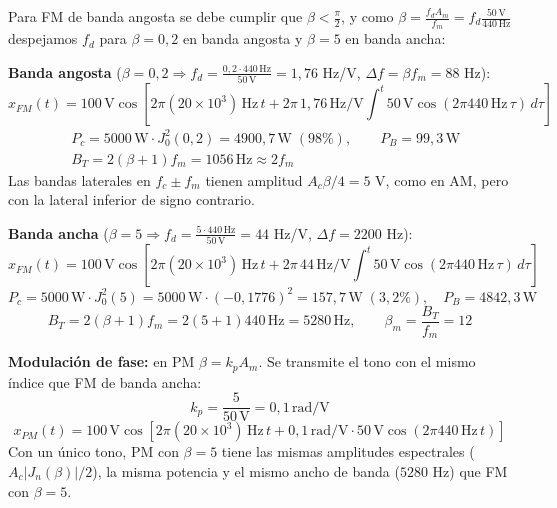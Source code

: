 \documentclass[11pt,a4paper]{article}
\numberwithin{equation}{section}
\begin{document}
Para FM de banda angosta se debe cumplir que $\beta < \frac{\pi}{2}$, y como $\beta =\frac{f_dA_m}{f_m}=f_d\frac{50\,\mathrm{V}}{440\,\mathrm{Hz}}$ despejamos $f_d$ para $\beta = 0,2$ en banda angosta y $\beta = 5$ en banda ancha:

\textbf{Banda angosta} ($\beta=0,2 \Rightarrow f_d=\frac{0,2\cdot 440\,\mathrm{Hz}}{50\,\mathrm{V}}=1,76$ Hz/V, $\Delta f=\beta f_m=88$ Hz):
\begin{equation}
  x_{FM}(t)=100\,\mathrm{V}\cos\left[ 2\pi (20\times 10^3)\,\mathrm{Hz}\,t + 2\pi\, 1,76\,\mathrm{Hz/V}\int_{}^{t} 50\,\mathrm{V}\cos(2\pi 440\,\mathrm{Hz}\,\tau)\, d\tau \right]
\end{equation}
\begin{equation}
  \begin{aligned}
    &P_c=5000\,\mathrm{W}\cdot J_0^2(0,2)=4900,7\,\mathrm{W}\;(98\%),\qquad P_B=99,3\,\mathrm{W}\\
    &B_T=2(\beta+1)f_m=1056\,\mathrm{Hz}\approx 2f_m
  \end{aligned}
\end{equation}
Las bandas laterales en $f_c\pm f_m$ tienen amplitud $A_c\beta/4=5$ V, como en AM, pero con la lateral inferior de signo contrario.

\textbf{Banda ancha} ($\beta=5 \Rightarrow f_d=\frac{5\cdot 440\,\mathrm{Hz}}{50\,\mathrm{V}}=44$ Hz/V, $\Delta f=2200$ Hz):
\begin{equation}
  x_{FM}(t)=100\,\mathrm{V}\cos\left[ 2\pi (20\times 10^3)\,\mathrm{Hz}\,t + 2\pi\, 44\,\mathrm{Hz/V}\int_{}^{t} 50\,\mathrm{V}\cos(2\pi 440\,\mathrm{Hz}\,\tau)\, d\tau \right]
\end{equation}
\begin{equation}
  P_c=5000\,\mathrm{W}\cdot J_0^2(5)=5000\,\mathrm{W}\cdot(-0,1776)^2=157,7\,\mathrm{W}\;(3,2\%),\quad P_B=4842,3\,\mathrm{W}
\end{equation}
\begin{equation}
  B_T=2(\beta+1)f_m=2(5+1)440\,\mathrm{Hz}=5280\,\mathrm{Hz},\qquad \beta_m=\frac{B_T}{f_m}=12
\end{equation}

\textbf{Modulación de fase:} en PM $\beta=k_pA_m$. Se transmite el tono con el mismo índice que FM de banda ancha:
\begin{equation}
  k_p=\frac{5}{50\,\mathrm{V}}=0,1\,\mathrm{rad/V}
\end{equation}
\begin{equation}
  x_{PM}(t)=100\,\mathrm{V}\cos[2\pi (20\times 10^3)\,\mathrm{Hz}\,t + 0,1\,\mathrm{rad/V}\cdot 50\,\mathrm{V}\cos(2\pi 440\,\mathrm{Hz}\,t)]
\end{equation}
Con un único tono, PM con $\beta=5$ tiene las mismas amplitudes espectrales ($A_c\lvert J_n(\beta)\rvert/2$), la misma potencia y el mismo ancho de banda ($5280$ Hz) que FM con $\beta=5$.
\end{document}
